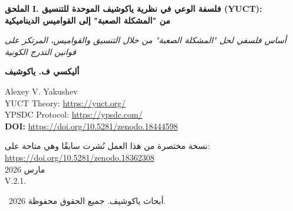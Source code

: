 \documentclass[12pt,a4paper]{article}
\begin{document}
	
	\begin{titlepage}
		\begin{center}
			\vspace*{0cm}
			
			\Huge\textbf{الملحق I. فلسفة الوعي في نظرية ياكوشيف الموحدة للتنسيق (YUCT):\\ من "المشكلة الصعبة" إلى القواميس الديناميكية}
			
			\vspace{1cm}
			
			\small\textit{أساس فلسفي لحل "المشكلة الصعبة" من خلال التنسيق والقواميس، المرتكز على قوانين التدرج الكونية}
			
			\vspace{0.5cm}
			
			\small\textbf{أليكسي ف. ياكوشيف}
			
			\vspace{0.5cm}
			\Large
			Alexey V. Yakushev\\
			
			YUCT Theory: \url{https://yuct.org/}\\
			YPSDC Protocol: \url{https://ypsdc.com/}\\
			
			\vspace{1cm}
			\textbf{DOI:} \url{https://doi.org/10.5281/zenodo.18444598}\\
			
			\vspace{0.5cm}
			
			\vspace{0cm}
			\large 
			نسخة مختصرة من هذا العمل نُشرت سابقًا وهي متاحة على: \\ \url{https://doi.org/10.5281/zenodo.18362308}\\
			\vspace{1cm}
			مارس 2026 \\ \large V.2.1.
			
			\vspace{4cm}
			\textcopyright~2026 أبحاث ياكوشيف. جميع الحقوق محفوظة.
			
			\newpage
			
			\begin{abstract}
				\noindent
				تقدم هذه المقالة أساسًا فلسفيًا لحل "المشكلة الصعبة للوعي" ضمن إطار نظرية التنسيق الموحدة (YUCT). يُفهم الوعي ليس كظاهرة ثانوية أو وهم، بل \textbf{كعملية تنسيق ديناميكية} تُنفذ من خلال تسلسل هرمي من \textbf{القواميس الداخلية}. نُظهر أن ثنائية "الدماغ–الوعي" الكلاسيكية يتم تجاوزها من خلال نموذج ثلاثي المستويات: \textbf{القواميس الجينية}، و\textbf{العصبية}، و\textbf{الثقافية}. يتم تفسير التجربة الذاتية كنتيجة \textbf{للتنسيق الحي} بين التجمعات العصبية باستخدام فضاءات دلالية مشتركة. يفسر القاموس الفوقي (القدرة على التأمل في حالات المرء الذاتية) ظاهرة الذاتية.
				

\end{abstract}
\end{center}
\end{titlepage}
\end{document}
